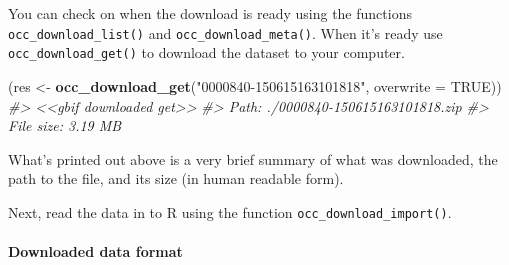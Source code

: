 \documentclass[author-year, review, 11pt]{components/elsarticle} %
\newenvironment{Shaded}{\begin{snugshade}}{\end{snugshade}}
\newcommand{\KeywordTok}[1]{\textcolor[rgb]{0.13,0.29,0.53}{\textbf{{#1}}}}
\newcommand{\DataTypeTok}[1]{\textcolor[rgb]{0.13,0.29,0.53}{{#1}}}
\newcommand{\StringTok}[1]{\textcolor[rgb]{0.31,0.60,0.02}{{#1}}}
\newcommand{\CommentTok}[1]{\textcolor[rgb]{0.56,0.35,0.01}{\textit{{#1}}}}
\newcommand{\OtherTok}[1]{\textcolor[rgb]{0.56,0.35,0.01}{{#1}}}
\newcommand{\NormalTok}[1]{{#1}}
\begin{document}
You can check on when the download is ready using the functions
\texttt{occ\_download\_list()} and \texttt{occ\_download\_meta()}. When
it's ready use \texttt{occ\_download\_get()} to download the dataset to
your computer.

\begin{Shaded}
\begin{Highlighting}[]
\NormalTok{(res <-}\StringTok{ }\KeywordTok{occ_download_get}\NormalTok{(}\StringTok{"0000840-150615163101818"}\NormalTok{, }\DataTypeTok{overwrite =} \OtherTok{TRUE}\NormalTok{))}
\CommentTok{#> <<gbif downloaded get>>}
\CommentTok{#>   Path: ./0000840-150615163101818.zip}
\CommentTok{#>   File size: 3.19 MB}
\end{Highlighting}
\end{Shaded}

What's printed out above is a very brief summary of what was downloaded,
the path to the file, and its size (in human readable form).

Next, read the data in to R using the function
\texttt{occ\_download\_import()}.

\begin{Shaded}
\end{Shaded}

\paragraph{Downloaded data format}\label{downloaded-data-format}
\end{document}

